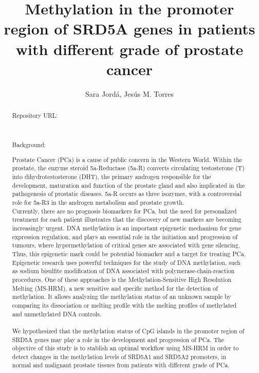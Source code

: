 \documentclass[a4paper,11pt]{article}
\begin{document}
 \title{Methylation in the promoter region of SRD5A genes in patients with different grade of prostate cancer} \author{Sara Jordá, Jesús M. Torres} \maketitle
	\begin{abstract}
		\begin{bf}Repository URL: \end{bf} \\ 
	
	\begin{bf}Background: \end{bf}Prostate Cancer (PCa) is a cause of public concern in the Western World. Within the prostate, the enzyme steroid 5a-Reductase (5a-R) converts circulating testosterone (T) into dihydrotestosterone (DHT), the primary androgen responsible for the development, maturation and function of the prostate gland and also implicated in the pathogenesis of prostatic diseases. 5a-R occurs as three isozymes, with a controversial role for 5a-R3 in the androgen metabolism and prostate growth. \\
		Currently, there are no prognosis biomarkers for PCa, but the need for personalized treatment for each patient illustrates that the discovery of new markers are becoming increasingly urgent. DNA methylation is an important epigenetic mechanism for gene expression regulation, and plays an essential role in the initiation and progression of tumours, where hypermethylation of critical genes are associated with gene silencing. Thus, this epigenetic mark could be potential biomarker and a target for treating PCa. Epigenetic research uses powerful techniques for the study of DNA methylation, such as sodium bisulfite modification of DNA associated with polymerase-chain-reaction procedures. One of these approaches is the Methylation-Sensitive High Resolution Melting (MS-HRM), a new sensitive and specific method for the detection of methylation. It allows analyzing the methylation status of an unknown sample by comparing its dissociation or melting profile with the melting profiles of methylated and unmethylated DNA controls. \\ \\
		We hypothesized that the methylation status of CpG islands in the promoter region of SRD5A genes may play a role in the development and progression of PCa. The objective of this study is to stablish an optimal workflow using MS-HRM in order to detect changes in the methylation levels of SRD5A1 and SRD5A2 promoters, in normal and malignant prostate tissues from patients with different grade of PCa. \\
		

\end{abstract}
\end{document}
